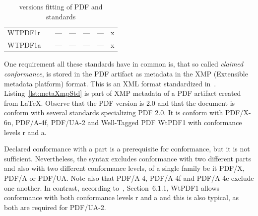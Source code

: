 \begin{table}[htb]
\begin{tabular}{llccccc}
  \midrule
  WTPDF1r       & \cite{WtPDF1}  & --- & --- & --- & --- & x   \\
  WTPDF1a       & \cite{WtPDF1}  & --- & --- & --- & --- & x   \\
\bottomrule
\end{tabular}
\caption{\label{tab:versPdfStd} versions fitting of PDF and standards}
\end{table}

One requirement all these standards have in common is, 
that so called \emph{claimed conformance}, 
is stored in the PDF artifact as metadata in the XMP (Extensible metadata platform) format. 
This is an XML format standardized in~\cite{ISO16684-2}. 
Listing~\ref{lst:metaXmpStd} is part of XMP metadata of a PDF artifact created from \LaTeX{}. 
Observe that the PDF version is 2.0 and that the document is conform with several standards specializing PDF 2.0. 
It is conform with PDF/X-6n, PDF/A-4f, PDF/UA-2 and Well-Tagged PDF WtPDF1 with conformance levels r and a. 

Declared conformance with a part is a prerequisite for conformance, but it is not sufficient. 
Nevertheless, the syntax excludes conformance with two different parts and also with two different conformance levels, 
of a single family be it PDF/X, PDF/A or PDF/UA\@. 
Note also that PDF/A-4, PDF/A-4f and PDF/A-4e exclude one another. 
In contrast, according to~\cite{WtPDF1}, Section~6.1.1, WtPDF1 allows conformance with both conformance levels r and a 
and this is also typical, as both are required for PDF/UA-2. 


